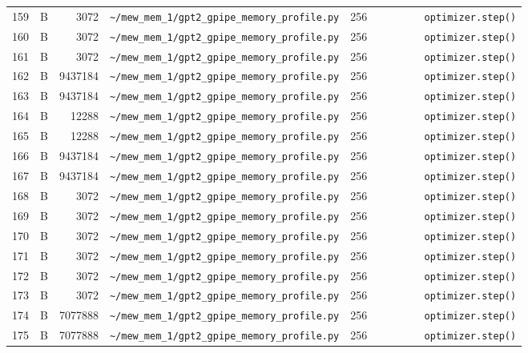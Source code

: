 \documentclass{article}
\begin{document}
\begin{longtable}{r l r p{6.5cm} r p{7.0cm}}
159 & B & 3072 & \lstinline|~/mew_mem_1/gpt2_gpipe_memory_profile.py| & 256 & \lstinline|        optimizer.step()| \\
160 & B & 3072 & \lstinline|~/mew_mem_1/gpt2_gpipe_memory_profile.py| & 256 & \lstinline|        optimizer.step()| \\
161 & B & 3072 & \lstinline|~/mew_mem_1/gpt2_gpipe_memory_profile.py| & 256 & \lstinline|        optimizer.step()| \\
162 & B & 9437184 & \lstinline|~/mew_mem_1/gpt2_gpipe_memory_profile.py| & 256 & \lstinline|        optimizer.step()| \\
163 & B & 9437184 & \lstinline|~/mew_mem_1/gpt2_gpipe_memory_profile.py| & 256 & \lstinline|        optimizer.step()| \\
164 & B & 12288 & \lstinline|~/mew_mem_1/gpt2_gpipe_memory_profile.py| & 256 & \lstinline|        optimizer.step()| \\
165 & B & 12288 & \lstinline|~/mew_mem_1/gpt2_gpipe_memory_profile.py| & 256 & \lstinline|        optimizer.step()| \\
166 & B & 9437184 & \lstinline|~/mew_mem_1/gpt2_gpipe_memory_profile.py| & 256 & \lstinline|        optimizer.step()| \\
167 & B & 9437184 & \lstinline|~/mew_mem_1/gpt2_gpipe_memory_profile.py| & 256 & \lstinline|        optimizer.step()| \\
168 & B & 3072 & \lstinline|~/mew_mem_1/gpt2_gpipe_memory_profile.py| & 256 & \lstinline|        optimizer.step()| \\
169 & B & 3072 & \lstinline|~/mew_mem_1/gpt2_gpipe_memory_profile.py| & 256 & \lstinline|        optimizer.step()| \\
170 & B & 3072 & \lstinline|~/mew_mem_1/gpt2_gpipe_memory_profile.py| & 256 & \lstinline|        optimizer.step()| \\
171 & B & 3072 & \lstinline|~/mew_mem_1/gpt2_gpipe_memory_profile.py| & 256 & \lstinline|        optimizer.step()| \\
172 & B & 3072 & \lstinline|~/mew_mem_1/gpt2_gpipe_memory_profile.py| & 256 & \lstinline|        optimizer.step()| \\
173 & B & 3072 & \lstinline|~/mew_mem_1/gpt2_gpipe_memory_profile.py| & 256 & \lstinline|        optimizer.step()| \\
174 & B & 7077888 & \lstinline|~/mew_mem_1/gpt2_gpipe_memory_profile.py| & 256 & \lstinline|        optimizer.step()| \\
175 & B & 7077888 & \lstinline|~/mew_mem_1/gpt2_gpipe_memory_profile.py| & 256 & \lstinline|        optimizer.step()| \\

\end{longtable}
\end{document}
